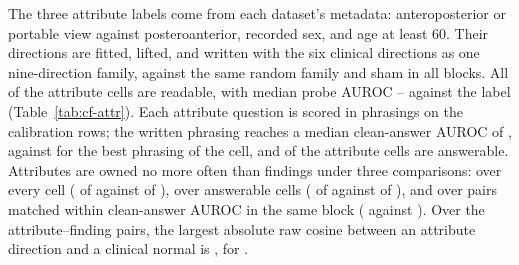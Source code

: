 \documentclass{article}
\begin{document}
The three attribute labels come from each dataset's metadata: anteroposterior or portable view against posteroanterior, recorded sex, and age at least 60. Their directions are fitted, lifted, and written with the six clinical directions as one nine-direction family, against the same random family and sham in all \cfAttrRefBlocks{} blocks. All \cfAttrReadable{} of the \cfAttrChestAttrN{} attribute cells are readable, with median probe AUROC \cfAttrAurocMin{}--\cfAttrAurocMax{} against the label (Table~\ref{tab:cf-attr}). Each attribute question is scored in \cfAttrqPhrasings{} phrasings on the calibration rows; the written phrasing reaches a median clean-answer AUROC of \cfAttrqWrittenAuroc{}, against \cfAttrqSelectedAuroc{} for the best phrasing of the cell, and \cfAttrqCapable{} of the \cfAttrqCells{} attribute cells are answerable. Attributes are owned no more often than findings under three comparisons: over every cell (\cfAttrChestAttrOwned{} of \cfAttrChestAttrN{} against \cfAttrChestClinOwned{} of \cfAttrChestClinN{}), over answerable cells (\cfAttrCapAttrOwned{} of \cfAttrCapAttrN{} against \cfAttrCapClinOwned{} of \cfAttrCapClinN{}), and over \cfAttrPairAttrN{} pairs matched within \cfAttrPairWindow{} clean-answer AUROC in the same block (\cfAttrPairAttrOwned{} against \cfAttrPairClinOwned{}). Over the \cfAttrCosPairs{} attribute--finding pairs, the largest absolute raw cosine between an attribute direction and a clinical normal is \cfAttrCosMax{}, for \cfAttrCosPairLabel{}.
\end{document}
